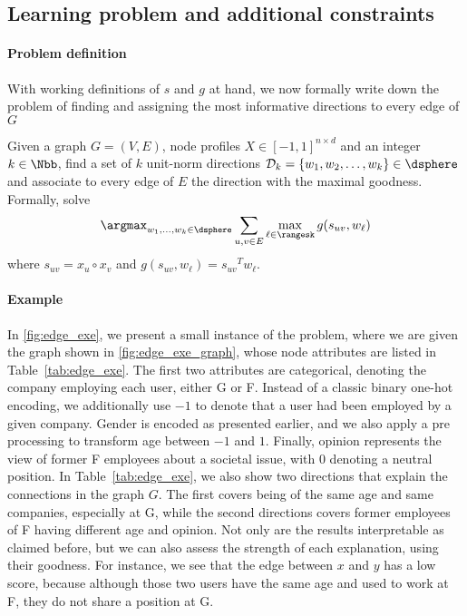 \subsection{Learning problem and additional constraints}
\label{sub:edge_constraints}

\paragraph{Problem definition}

With working definitions of $s$ and $g$ at hand, we now formally write down the problem of
finding and assigning the most informative directions to every edge of $G$
\begin{problem}[\ecp{}]
  \label{p:edge_full}
  Given a graph $G=(V, E)$, node profiles $X\in [-1, 1]^{n\times d}$ and an integer $k \in \Nbb$,
  find a set of $k$ unit-norm directions $\mathcal{D}_k = \{w_1, w_2, \ldots, w_k\} \in \dsphere$
  and associate to every edge of $E$ the direction with the maximal goodness. Formally, solve
  \begin{equation}
    \label{eq:edge_full}
    \argmax_{w_1,\ldots,w_k \in \dsphere}
    \sum_{u,v \in E} \max_{\ell \in \rangesk} g(s_{uv}, w_{\ell})
  \end{equation}
  where $s_{uv} = x_u \circ x_v$ and $g(s_{uv}, w_{\ell}) = {s_{uv}}^T w_{\ell}$.
\end{problem}

\paragraph{Example}

In \autoref{fig:edge_exe}, we present a small instance of the \ecp{} problem, where we are given the
graph shown in \autoref{fig:edge_exe_graph}, whose node attributes are listed
in Table~\ref{tab:edge_exe}. The first two attributes are categorical, denoting the company employing
each user, either \textsf{G} or \textsf{F}. Instead of a classic binary one-hot encoding, we
additionally use $-1$ to denote that a user had been employed by a given company. \textsf{Gender} is
encoded as presented earlier, and we also apply a pre processing to transform \textsf{age} between
$-1$ and $1$. Finally, \textsf{opinion} represents the view of former \textsf{F} employees about a
societal issue, with $0$ denoting a neutral position. In Table~\ref{tab:edge_exe}, we also show two
directions that explain the connections in the graph $G$. The first covers being of the same age and
same companies, especially at \textsf{G}, while the second directions covers former employees of
\textsf{F} having different \textsf{age} and \textsf{opinion}. Not only are the results
interpretable as claimed before, but we can also assess the strength of each explanation, using
their goodness. For instance, we see that the edge between $x$ and $y$ has a low score, because
although those two users have the same \textsf{age} and used to work at \textsf{F}, they do not
share a position at \textsf{G}.

